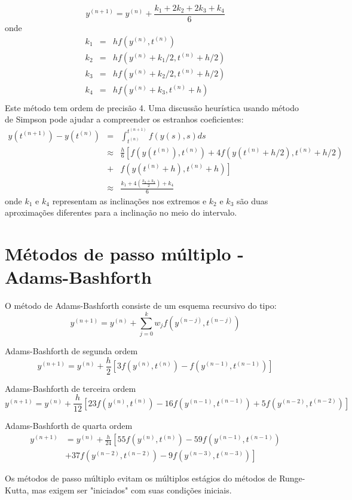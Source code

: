 $$y^{(n+1)}=y^{(n)}+\frac{k_1+2k_2+2k_3+k_4}{6}$$
onde
\begin{eqnarray*}
k_1&=&hf(y^{(n)},t^{(n)})\\
k_2&=&hf(y^{(n)}+k_1/2,t^{(n)}+h/2)\\
k_3&=&hf(y^{(n)}+k_2/2,t^{(n)}+h/2)\\
k_4&=&hf(y^{(n)}+k_3,t^{(n)}+h)\\
\end{eqnarray*}
Este método tem ordem de precisão 4. Uma discussão heurística usando método de Simpson pode ajudar a compreender os estranhos coeficientes:
\begin{eqnarray*}
y({t^{(n+1)}})-y({t^{(n)}})&=&\int_{t^{(n)}}^{t^{(n+1)}}f(y(s),s)ds \\
&\approx& \frac{h}{6}\left[ f\left(y(t^{(n)}),t^{(n)}\right)+4f\left(y(t^{(n)}+h/2),t^{(n)}+h/2\right)\right.\\
&+&\left.f\left(y(t^{(n)}+h),t^{(n)}+h\right)\right]\\
&\approx& \frac{k_1+4(\frac{k_2+k_3}{2})+k_4}{6}
\end{eqnarray*}
onde $k_1$ e $k_4$ representam as inclinações nos extremos e $k_2$ e $k_3$ são duas aproximações diferentes para a inclinação no meio do intervalo.


\section{Métodos de passo múltiplo - Adams-Bashforth}

O método de Adams-Bashforth consiste de um esquema recursivo do tipo:
$$y^{(n+1)}=y^{(n)}+\sum_{j=0}^k w_jf(y^{(n-j)},t^{(n-j)})$$

\begin{ex} Adams-Bashforth de segunda ordem
$$y^{(n+1)}=y^{(n)}+\frac{h}{2}\left[3f\left(y^{(n)},t^{(n)}\right)-f\left(y^{(n-1)},t^{(n-1)}\right)\right]$$
\end{ex}

\begin{ex} Adams-Bashforth de terceira ordem
$$y^{(n+1)}=y^{(n)}+\frac{h}{12}\left[23f\left(y^{(n)},t^{(n)}\right)-16f\left(y^{(n-1)},t^{(n-1)}\right)+5f\left(y^{(n-2)},t^{(n-2)}\right)\right]$$
\end{ex}

\begin{ex} Adams-Bashforth de quarta ordem
  \begin{equation*}
    \begin{split}
      y^{(n+1)} &= y^{(n)} + \frac{h}{24}\left[55f\left(y^{(n)},t^{(n)}\right)-59f\left(y^{(n-1)},t^{(n-1)}\right)\right.\\
        &+\left. 37f\left(y^{(n-2)},t^{(n-2)}\right)-9f\left(y^{(n-3)},t^{(n-3)}\right)\right]    
    \end{split}
  \end{equation*}
\end{ex}
Os métodos de passo múltiplo evitam os múltiplos estágios do métodos de Runge-Kutta, mas exigem ser "iniciados" com suas condições iniciais.

